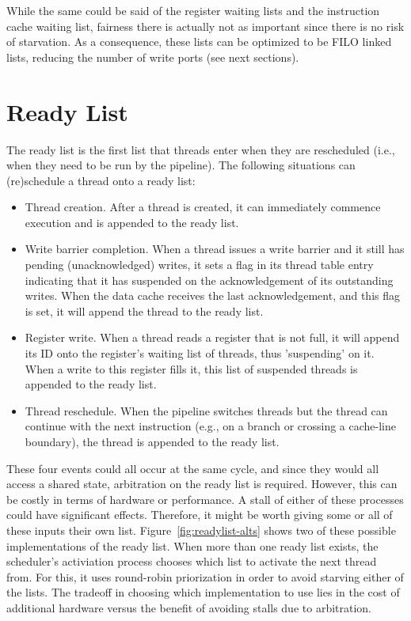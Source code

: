 While the same could be said of the register waiting lists and the instruction cache waiting list, fairness there is actually not as important since there is no risk of starvation. As a consequence, these lists can be optimized to be FILO linked lists, reducing the number of write ports (see next sections).

\section{\label{sec:ready-list}Ready List}
The ready list is the first list that threads enter when they are rescheduled (i.e., when they need to be run by the pipeline). The following situations can (re)schedule a thread onto a ready list:
\begin{itemize}
\item{} Thread creation. After a thread is created, it can immediately commence execution and is appended to the ready list.
\item{} Write barrier completion. When a thread issues a write barrier and it still has pending (unacknowledged) writes, it sets a flag in its thread table entry indicating that it has suspended on the acknowledgement of its outstanding writes. When the data cache receives the last acknowledgement, and this flag is set, it will append the thread to the ready list.
\item{} Register write. When a thread reads a register that is not full, it will append its ID onto the register's waiting list of threads, thus 'suspending' on it. When a write to this register fills it, this list of suspended threads is appended to the ready list.
\item{} Thread reschedule. When the pipeline switches threads but the thread can continue with the next instruction (e.g., on a branch or crossing a cache-line boundary), the thread is appended to the ready list.
\end{itemize}

These four events could all occur at the same cycle, and since they would all access a shared state, arbitration on the ready list is required. However, this can be costly in terms of hardware or performance. A stall of either of these processes could have significant effects. Therefore, it might be worth giving some or all of these inputs their own list. Figure~\ref{fig:readylist-alts} shows two of these possible implementations of the ready list. When more than one ready list exists, the scheduler's activiation process chooses which list to activate the next thread from. For this, it uses round-robin priorization in order to avoid starving either of the lists. The tradeoff in choosing which implementation to use lies in the cost of additional hardware versus the benefit of avoiding stalls due to arbitration. 

